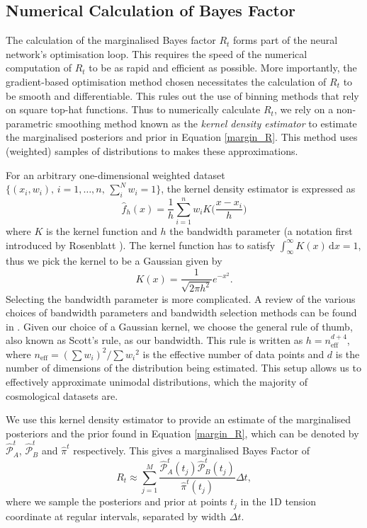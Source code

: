 \documentclass[%
 reprint,
 amsmath,amssymb,
 aps,
]{revtex4-2}
\begin{document}
\subsection{Numerical Calculation of Bayes Factor} \label{section:numerical_bf}

The calculation of the marginalised Bayes factor $R_t$ forms part of the neural network's optimisation loop. This requires the speed of the numerical computation of $R_t$ to be as rapid and efficient as possible. More importantly, the gradient-based optimisation method chosen necessitates the calculation of $R_t$ to be smooth and differentiable. This rules out the use of binning methods that rely on square top-hat functions. Thus to numerically calculate $R_t$, we rely on a non-parametric smoothing method known as the \textit{kernel density estimator} \cite{Rosenblatt1956, Silverman1986} to estimate the marginalised posteriors and prior in Equation \ref{margin_R}. This method uses (weighted) samples of distributions to makes these approximations.

For an arbitrary one-dimensional weighted dataset $\{(x_{i}, w_{i}), \, i = 1, \dots , n, \, \sum_i^N w_{i} = 1\}$, the kernel density estimator is expressed as
\begin{equation}
    \hat{f}_h (x) = \frac{1}{h} \sum_{i = 1}^{n} w_{i} K \bigg( \frac{x - x_{i}}{h} \bigg)
\end{equation}
where $K$ is the kernel function and $h$ the bandwidth parameter (a notation first introduced by Rosenblatt \cite{Rosenblatt1956}). The kernel function has to satisfy $\int_{\infty}^{\infty} K(x) \, \textrm{d} x = 1$, thus we pick the kernel to be a Gaussian given by
\begin{equation}
    K(x) = \frac{1}{\sqrt{2\pi h^2}} e^{-x^2}.
\end{equation}
Selecting the bandwidth parameter is more complicated. A review of the various choices of bandwidth parameters and bandwidth selection methods can be found in \cite{Turlach1993}. Given our choice of a Gaussian kernel, we choose the general rule of thumb, also known as Scott's rule, as our bandwidth. This rule is written as $h = n_{\textrm{eff}}^{d + 4}$, where $n_{\textrm{eff}} = (\sum w_{i})^2 / {\sum {w_{i}}^2}$ is the effective number of data points and $d$ is the number of dimensions of the distribution being estimated. This setup allows us to effectively approximate unimodal distributions, which the majority of cosmological datasets are.

We use this kernel density estimator to provide an estimate of the marginalised posteriors and the prior found in Equation \ref{margin_R}, which can be denoted by $\hat{\mathcal{P}}_A^{t}$, $\hat{\mathcal{P}}_B^{t}$ and $\hat{\pi}^{t}$ respectively. This gives a marginalised Bayes Factor of
\begin{equation}
    R_t \approx \sum_{j = 1}^{M} \frac{\hat{\mathcal{P}}_A^{t}(t_j) \hat{\mathcal{P}}_B^{t}(t_j)}{\hat{\pi}^{t}(t_j)} \Delta t,
\end{equation}
where we sample the posteriors and prior at points $t_j$ in the 1D tension coordinate at regular intervals, separated by width $\Delta t$.
\end{document}

